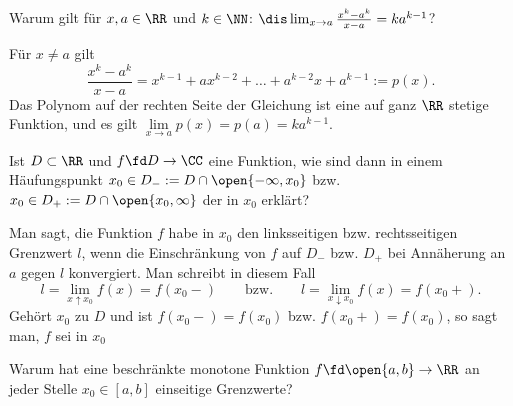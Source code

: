 \begin{frage}
  Warum gilt für $x,a\in\RR$ und $k\in \NN$: $
  \dis\lim_{x\to a} \frac{x^k-a^k}{x-a} = ka^{k-1}$?
\end{frage}  

\begin{antwort}
  Für $x\not=a$ gilt
  \[
  \frac{x^k-a^k}{x-a} = x^{k-1}+ax^{k-2} + \ldots + a^{k-2}x+a^{k-1} :=p(x).
  \]
  Das Polynom auf der rechten Seite der Gleichung ist eine auf ganz $\RR$ 
  stetige Funktion, und es gilt $\lim\limits_{x\to a} p(x)=p(a)=ka^{k-1}$.
  \AntEnd
\end{antwort}

\begin{frage}
  Ist $D \subset \RR$ und $f\fd  D\to \CC$ eine Funktion, wie sind dann in 
  einem Häufungspunkt $x_0 \in D_- :=  D\cap \open{-\infty, x_0}$ bzw. 
  $x_0 \in D_+ := D\cap \open{x_0,\infty}$ der 
   in $x_0$ erklärt?
\end{frage}

\begin{antwort}
  Man sagt, die Funktion $f$ habe in $x_0$ den linksseitigen 
  bzw. rechtsseitigen Grenzwert $l$, wenn die Einschränkung von 
  $f$ auf $D_-$ bzw. $D_+$ bei Annäherung an $a$ gegen $l$ konvergiert. Man 
  schreibt in diesem Fall
  \[
  l = \lim_{x\uparrow x_0} f(x)  = f(x_0 - )\qquad\text{bzw.}\qquad 
  l = \lim_{x\downarrow x_0} f(x)  = f(x_0 + ).
  \] 
  Gehört $x_0$ zu $D$ und ist $f(x_0-)=f(x_0)$ bzw. 
  $f(x_0+)=f(x_0)$, so sagt man, $f$ sei in $x_0$ 
  \AntEnd
\end{antwort}

\begin{frage}
  Warum hat eine beschränkte monotone Funktion $f\fd\open{a,b}\to\RR$ 
  an jeder Stelle $x_0\in [a,b]$ einseitige Grenzwerte?
\end{frage}

